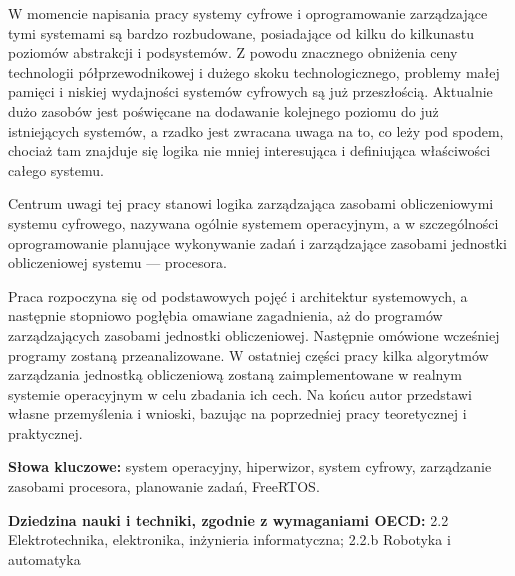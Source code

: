 \documentclass[../main]{subfiles}
\begin{document}
W momencie napisania pracy systemy cyfrowe i oprogramowanie zarządzające tymi systemami są bardzo rozbudowane, posiadające od kilku do kilkunastu poziomów abstrakcji i podsystemów. Z powodu znacznego obniżenia ceny technologii półprzewodnikowej i dużego skoku technologicznego, problemy małej pamięci i niskiej wydajności systemów cyfrowych są już przeszłością. Aktualnie dużo zasobów jest poświęcane na dodawanie kolejnego poziomu do już istniejących systemów, a rzadko jest zwracana uwaga na to, co leży pod spodem, chociaż tam znajduje się logika nie mniej interesująca i definiująca właściwości całego systemu.

Centrum uwagi tej pracy stanowi logika zarządzająca zasobami obliczeniowymi systemu cyfrowego, nazywana ogólnie systemem operacyjnym, a w szczególności oprogramowanie planujące wykonywanie zadań i zarządzające zasobami jednostki obliczeniowej systemu — procesora.

Praca rozpoczyna się od podstawowych pojęć i architektur systemowych, a następnie stopniowo pogłębia omawiane zagadnienia, aż do programów zarządzających zasobami jednostki obliczeniowej. Następnie omówione wcześniej programy zostaną przeanalizowane. W ostatniej części pracy kilka algorytmów zarządzania jednostką obliczeniową zostaną zaimplementowane w realnym systemie operacyjnym w celu zbadania ich cech. Na końcu autor przedstawi własne przemyślenia i wnioski, bazując na poprzedniej pracy teoretycznej i praktycznej.

\noindent\textbf{Słowa kluczowe:} system operacyjny, hiperwizor, system cyfrowy, zarządzanie zasobami procesora, planowanie zadań, FreeRTOS.

\noindent\textbf{Dziedzina nauki i techniki, zgodnie z wymaganiami OECD:} 2.2 Elektrotechnika, elektronika, inżynieria informatyczna; 2.2.b Robotyka i automatyka
\end{document}
